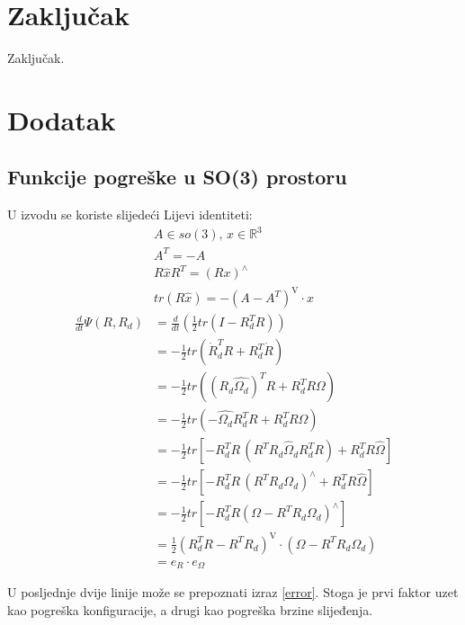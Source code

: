 \documentclass[times, utf8, diplomski]{fer}
\begin{document}
\chapter{Zaključak}
Zaključak.

\chapter{Dodatak}
	\section{Funkcije pogreške u SO(3) prostoru}
	
	U izvodu se koriste slijedeći Lijevi identiteti:
	\begin{gather}
		A\in so(3), \,  x\in\mathbb{R}^3 \\
		A^T = -A \\
		R \hat{x}R^T = (Rx)^\wedge \\
		tr(R\hat{x}) = - (A - A^T)^\text{V} \cdot x
	\end{gather}
	\begin{align*}
		\frac{d}{dt}\Psi(R, R_d) &= \frac{d}{dt} ( \frac{1}{2} tr(I - R_d^TR)) \\
		&= - \frac{1}{2}tr(\dot{R}_d^TR + R_d^T\dot{R}) \\
		&= - \frac{1}{2}tr( (R_d \hat{\Omega_d})^TR + R_d^TR\Omega ) \\
		&=  - \frac{1}{2}tr( -\hat{\Omega_d}R_d^TR + R_d^TR\hat{\Omega}) \\
		&= - \frac{1}{2}tr[ -R_d^TR \, (R^TR_d\hat{\Omega}_dR_d^TR) + R_d^TR\hat{\Omega} ] \\
		&=  - \frac{1}{2}tr[ -R_d^TR \, (R^TR_d\Omega_d)^\wedge + R_d^TR\hat{\Omega} ] \\
		&= - \frac{1}{2}tr[ -R_d^TR (\Omega - R^TR_d\Omega_d)^\wedge ] \\
		&= \frac{1}{2}(R_d^TR - R^TR_d)^\text{V} \cdot (\Omega - R^TR_d\Omega_d) \\
		&= e_R \cdot e_\Omega
	\end{align*}
	
	U posljednje dvije linije može se prepoznati izraz \ref{error}. Stoga je prvi faktor uzet kao pogreška konfiguracije, a drugi kao pogreška brzine slijeđenja.
	
	\newpage
	\clearpage
	
\end{document}
